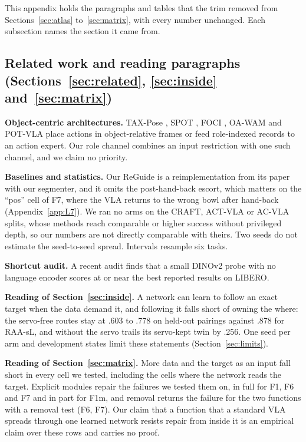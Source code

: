 This appendix holds the paragraphs and tables that the trim removed from Sections~\ref{sec:atlas} to~\ref{sec:matrix}, with every number unchanged. Each subsection names the section it came from.

\subsection{Related work and reading paragraphs (Sections~\ref{sec:related}, \ref{sec:inside} and~\ref{sec:matrix})}
\label{app:L0}

\textbf{Object-centric architectures.} TAX-Pose \citep{taxpose2211}, SPOT \citep{spot2411}, FOCI \citep{foci2609}, OA-WAM \citep{oawam2605} and POT-VLA \citep{potvla2607} place actions in object-relative frames or feed role-indexed records to an action expert. Our role channel combines an input restriction with one such channel, and we claim no priority.

\textbf{Baselines and statistics.} Our ReGuide is a reimplementation from its paper with our segmenter, and it omits the post-hand-back escort, which matters on the ``pos'' cell of F7, where the VLA returns to the wrong bowl after hand-back (Appendix~\ref{app:L7}). We ran no arms on the CRAFT, ACT-VLA or AC-VLA splits, whose methods reach comparable or higher success without privileged depth, so our numbers are not directly comparable with theirs. Two seeds do not estimate the seed-to-seed spread. Intervals resample six tasks.

\textbf{Shortcut audit.} A recent audit \citep{jiangaudit2606} finds that a small DINOv2 probe with no language encoder scores at or near the best reported results on LIBERO.

\textbf{Reading of Section~\ref{sec:inside}.} A network can learn to follow an exact target when the data demand it, and following it falls short of owning the where: the servo-free \pifive{} routes stay at .603 to .778 on held-out pairings against .878 for RAA-sL, and \pizero{} without the servo trails its servo-kept twin by .256. One seed per arm and development states limit these statements (Section~\ref{sec:limits}).

\textbf{Reading of Section~\ref{sec:matrix}.} More data and the target as an input fall short in every cell we tested, including the cells where the network reads the target. Explicit modules repair the failures we tested them on, in full for F1, F6 and F7 and in part for F1m, and removal returns the failure for the two functions with a removal test (F6, F7). Our claim that a function that a standard VLA spreads through one learned network resists repair from inside it is an empirical claim over these rows and carries no proof.

